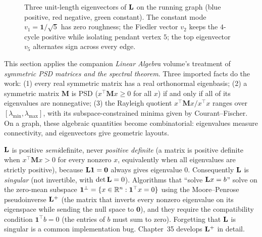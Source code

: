 \begin{figure}[htbp]
\caption{Three unit-length eigenvectors of $\mathbf{L}$ on the running graph (blue positive, red negative, green constant). The constant mode $v_1 = \mathbf{1}/\sqrt{5}$ has zero roughness; the Fiedler vector $v_2$ keeps the $4$-cycle positive while isolating pendant vertex $5$; the top eigenvector $v_5$ alternates sign across every edge.}
\label{ch31:fig-smoothness}
\end{figure}

\begin{connectionbox}
This section applies the companion \emph{Linear Algebra} volume's treatment of \emph{symmetric PSD matrices and the spectral theorem}. Three imported facts do the work: (1) every real symmetric matrix has a real orthonormal eigenbasis; (2) a symmetric matrix $\mathbf{M}$ is PSD ($x^\top \mathbf{M} x \ge 0$ for all $x$) if and only if all of its eigenvalues are nonnegative; (3) the Rayleigh quotient $x^\top \mathbf{M} x / x^\top x$ ranges over $[\lambda_{\min},\lambda_{\max}]$, with its subspace-constrained minima given by Courant--Fischer. On a graph, these algebraic quantities become combinatorial: eigenvalues measure connectivity, and eigenvectors give geometric layouts.
\end{connectionbox}

\begin{trapbox}
$\mathbf{L}$ is positive \emph{semi}definite, never \emph{positive definite} (a matrix is positive definite when $x^\top \mathbf{M} x > 0$ for every nonzero $x$, equivalently when all eigenvalues are strictly positive), because $\mathbf{L} \mathbf{1} = \mathbf{0}$ always gives eigenvalue $0$. Consequently $\mathbf{L}$ is \emph{singular} (not invertible, with $\det \mathbf{L} = 0$). Algorithms that ``solve $\mathbf{L} x = b$'' solve on the zero-mean subspace $\mathbf{1}^\perp = \{x\in\mathbb{R}^n : \mathbf{1}^\top x = 0\}$ using the Moore--Penrose pseudoinverse $\mathbf{L}^{+}$ (the matrix that inverts every nonzero eigenvalue on its eigenspace while sending the null space to $\mathbf{0}$), and they require the compatibility condition $\mathbf{1}^\top b = 0$ (the entries of $b$ must sum to zero). Forgetting that $\mathbf{L}$ is singular is a common implementation bug. Chapter~35 develops $\mathbf{L}^{+}$ in detail.
\end{trapbox}

